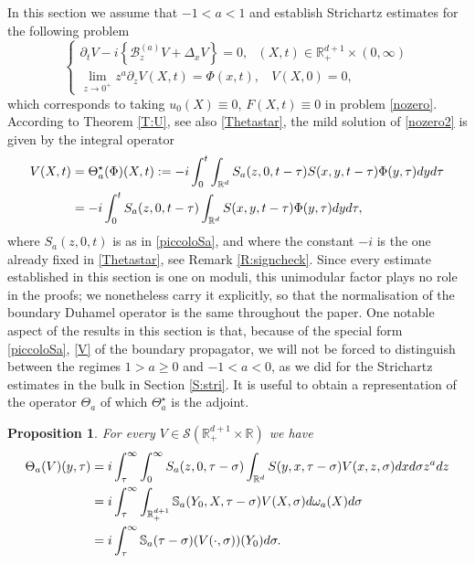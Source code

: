 \documentclass[11pt,letter]{amsart}
\def \RN {\mathbb{R}_+^{d+1}}
\def \R {\mathbb{R}}
\newcommand{\Rd}{\mathbb R^d}
\newcommand{\p}{\partial}
\numberwithin{equation}{section}
\newtheorem{proposition}[theorem]{Proposition}
\numberwithin{equation}{section}
\begin{document}
In this section we assume that $-1<a<1$ and establish Strichartz estimates for the following problem
\begin{equation}\label{nozero2}
\begin{cases}
\p_t V - i \left\{\mathscr B_z^{(a)} V +  \Delta_x V\right\} = 0,\ \ \ (X,t)\in \R_+^{d+1}\times (0,\infty)
\\
\underset{z\to 0^+}{\lim} z^a \p_z V(X,t) = \Phi(x,t),\ \  \ \ V(X,0) = 0,
\end{cases}
\end{equation}
which corresponds to taking $u_0(X) \equiv 0$, $F(X,t) \equiv 0$ in problem \eqref{nozero}. According to Theorem \ref{T:U}, see also \eqref{Thetastar},
 the mild solution of \eqref{nozero2} is given by the integral operator
\begin{align}\label{V}
V(X,t) & =  \Theta_a^\star(\Phi)(X,t) := - i \int_0^{t} \int_{\Rd}  S_a(z,0,t-\tau)S(x,y,t-\tau) \Phi(y,\tau) dy d\tau
\\
& = - i \int_0^{t} S_a(z,0,t-\tau) \int_{\Rd}  S(x,y,t-\tau) \Phi(y,\tau) dy d\tau,
\notag
\end{align}
where $S_a(z,0,t)$ is as in \eqref{piccoloSa}, and where the constant $-i$ is the one already fixed in \eqref{Thetastar}, see Remark \ref{R:signcheck}. Since every estimate established in this section is one on moduli, this unimodular factor plays no role in the proofs; we nonetheless carry it explicitly, so that the normalisation of the boundary Duhamel operator is the same throughout the paper.
One notable aspect of the results in this section is that, because of the special form \eqref{piccoloSa}, \eqref{V} of the boundary propagator, we will not be forced to distinguish between the regimes $1>a\ge 0$ and $-1<a<0$, as we did for the Strichartz estimates in the bulk in Section \ref{S:stri}. 
It is useful to obtain a representation of the operator $\Theta_a$ of which $\Theta^\star_a$ is the adjoint. 

\begin{proposition}\label{P:rep}
For every $V\in \mathscr S(\RN\times \R)$ we have
\begin{align}\label{T}
\Theta_a(V)(y,\tau) & = i \int_\tau^{\infty} \int_0^\infty   S_a(z,0,\tau-\sigma) \int_{\Rd}   S(y,x,\tau-\sigma) V(x,z,\sigma) dx d\sigma  z^a dz
\\
& = i \int_\tau^{\infty} \int_{\RN} \mathbb S_a(Y_0,X,\tau-\sigma) V(X,\sigma) d\omega_a(X) d\sigma
\notag
\\
& = i \int_\tau^{\infty} \mathbb S_a(\tau-\sigma)(V(\cdot,\sigma))(Y_0) d\sigma.
\notag
\end{align}
\end{proposition}
\end{document}
